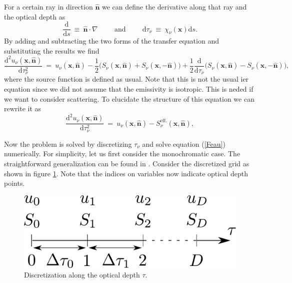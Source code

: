 \documentclass[]{article}
\newcommand{\D}{\text{d}}
\begin{document}
For a certain ray in direction $\hat{\textbf{n}}$ we can define the derivative along that ray and the optical depth as
\begin{equation}
\frac{\D}{\D s} \ \equiv \ \hat{\textbf{n}} \cdot \nabla \hspace{1cm} \text{and} \hspace{1cm} \D\tau_{\nu} \ \equiv \ \chi_{\nu}(\textbf{x}) \D s.
\end{equation}
By adding and subtracting the two forms of the transfer equation and substituting the results we find
\begin{equation}
\frac{\D^{2} u_{\nu}(\textbf{x},\hat{\textbf{n}})}{\D \tau_{\nu}^{2}} \ = \ u_{\nu}(\textbf{x},\hat{\textbf{n}}) - \frac{1}{2}\big( S_{\nu}(\textbf{x},\hat{\textbf{n}}) + S_{\nu}(\textbf{x},-\hat{\textbf{n}}) \big) + \frac{1}{2} \frac{\D}{\D\tau_{\nu}} \big( S_{\nu}(\textbf{x},\hat{\textbf{n}}) -  S_{\nu}(\textbf{x},-\hat{\textbf{n}}) \big) ,
\label{Feau}
\end{equation}
where the source function is defined as usual. Note that this is not the usual ier equation since we did not assume that the emissivity is isotropic. This is neded if we want to consider scattering. To elucidate the structure of this equation we can rewrite it as
\begin{equation}
\frac{\D^{2} u_{\nu}(\textbf{x},\hat{\textbf{n}})}{\D \tau_{\nu}^{2}} \ = \ u_{\nu}(\textbf{x},\hat{\textbf{n}}) - S_{\nu}^{\text{eff.}}(\textbf{x},\hat{\textbf{n}}) ,
\end{equation}


\bigskip

Now the problem is solved by discretizing $\tau_{\nu}$ and solve equation (\ref{Feau}) numerically. For simplicity, let us first consider the monochromatic case. The straightforward generalization can be found in \cite{Mihalas_s, MihalasMihalas}. Consider the discretized grid as shown in figure \ref{grid}. Note that the indices on variables now indicate optical depth points.
\begin{figure}[H]
	\centering
	\includegraphics[scale=.3]{Images/grid.pdf}
	\caption{Discretization along the optical depth $\tau$.}
	\label{grid}
\end{figure}
\end{document}
